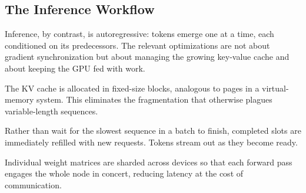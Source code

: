 \documentclass[11pt,a4paper]{article}
\theoremstyle{definition}
\theoremstyle{plain}
\begin{document}
\begin{center}
\end{center}

\subsection{The Inference Workflow}

Inference, by contrast, is autoregressive: tokens emerge one at a time, each conditioned on its predecessors. The relevant optimizations are not about gradient synchronization but about managing the growing key-value cache and about keeping the GPU fed with work.

\begin{description}[style=nextline, leftmargin=0.6cm, itemsep=4pt]
  \item[Paged attention.] The KV cache is allocated in fixed-size blocks, analogous to pages in a virtual-memory system. This eliminates the fragmentation that otherwise plagues variable-length sequences.
  \item[Continuous batching.] Rather than wait for the slowest sequence in a batch to finish, completed slots are immediately refilled with new requests. Tokens stream out as they become ready.
  \item[Tensor parallelism (TP).] Individual weight matrices are sharded across devices so that each forward pass engages the whole node in concert, reducing latency at the cost of communication.
\end{description}
\end{document}
